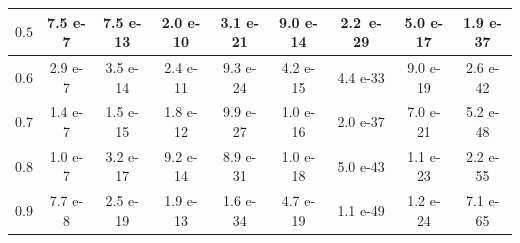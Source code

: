 \documentclass{article}
\begin{document}
\begin{table}[t!]
\begin{tabular}{|c|cccccccc|}
		$0.5$                & \multicolumn{1}{c|}{\small{7.5 e-7}} & \multicolumn{1}{c|}{\small{7.5 e-13}} & \multicolumn{1}{c|}{\small{2.0 e-10}} & \multicolumn{1}{c|}{\small{3.1 e-21}} & \multicolumn{1}{c|}{\small{9.0 e-14}} & \multicolumn{1}{c|}{\small{2.2\ e-29}} & \multicolumn{1}{c|}{\small{5.0 e-17}} & \small{1.9 e-37} \\ \hline
		$0.6$                & \multicolumn{1}{c|}{\small{2.9 e-7}} & \multicolumn{1}{c|}{\small{3.5 e-14}} & \multicolumn{1}{c|}{\small{2.4 e-11}} & \multicolumn{1}{c|}{\small{9.3 e-24}} & \multicolumn{1}{c|}{\small{4.2 e-15}} & \multicolumn{1}{c|}{\small{4.4 e-33}} & \multicolumn{1}{c|}{\small{9.0 e-19}} & \small{2.6 e-42} \\ \hline
		$0.7$                & \multicolumn{1}{c|}{\small{1.4 e-7}} & \multicolumn{1}{c|}{\small{1.5 e-15}} & \multicolumn{1}{c|}{\small{1.8 e-12}} & \multicolumn{1}{c|}{\small{9.9 e-27}} & \multicolumn{1}{c|}{\small{1.0 e-16}} & \multicolumn{1}{c|}{\small{2.0 e-37}} & \multicolumn{1}{c|}{\small{7.0 e-21}} & \small{5.2 e-48} \\ \hline
		$0.8$                & \multicolumn{1}{c|}{\small{1.0 e-7}} & \multicolumn{1}{c|}{\small{3.2 e-17}} & \multicolumn{1}{c|}{\small{9.2 e-14}} & \multicolumn{1}{c|}{\small{8.9 e-31}} & \multicolumn{1}{c|}{\small{1.0 e-18}} & \multicolumn{1}{c|}{\small{5.0 e-43}} & \multicolumn{1}{c|}{\small{1.1 e-23}} & \small{2.2 e-55} \\ \hline
		$0.9$                & \multicolumn{1}{c|}{\small{7.7 e-8}} & \multicolumn{1}{c|}{\small{2.5 e-19}} & \multicolumn{1}{c|}{\small{1.9 e-13}} & \multicolumn{1}{c|}{\small{1.6 e-34}} & \multicolumn{1}{c|}{\small{4.7 e-19}} & \multicolumn{1}{c|}{\small{1.1 e-49}} & \multicolumn{1}{c|}{\small{1.2 e-24}} & \small{7.1 e-65} \\ \hline
	\end{tabular}
\medskip 



\end{table}
\end{document}

